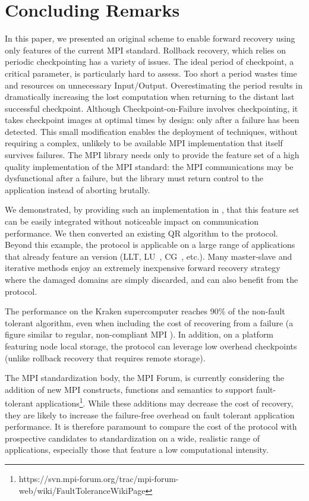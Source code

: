 \section{Concluding Remarks}

In this paper, we presented an original scheme to enable forward
recovery using only features of the current MPI standard.
Rollback recovery, which relies on periodic checkpointing has a variety
of issues. The ideal period of checkpoint, a critical parameter, is
particularly hard to assess. Too short a period wastes time and
resources on unnecessary Input/Output. Overestimating the period results
in dramatically increasing the lost computation when returning to the
distant last successful checkpoint. Although Checkpoint-on-Failure
involves checkpointing, it takes checkpoint images at optimal times by
design: only after a failure has been detected. This small modification
enables the deployment of \abft techniques, without requiring a complex,
unlikely to be available MPI implementation that itself survives
failures. The MPI library needs only to provide the feature set of a
high quality implementation of the MPI standard: the MPI communications
may be dysfunctional after a failure, but the library must return
control to the application instead of aborting brutally.

We demonstrated, by providing such an implementation in \ompi, that this
feature set can be easily integrated without noticeable impact on
communication performance. We then converted an existing \abft QR
algorithm to the \cof protocol. Beyond this example, the \cof protocol
is applicable on a large range of applications that already feature an
\abft version (LLT, LU~\cite{fthpl2011},
CG~\cite{Chen:2005:FTH:1065944.1065973}, etc.). Many master-slave and
iterative methods enjoy an extremely inexpensive forward recovery
strategy where the damaged domains are simply discarded, and can also
benefit from the \cof protocol.

The performance on the Kraken supercomputer reaches
90\% of the non-fault tolerant algorithm, even when including the cost
of recovering from a failure (a figure similar to regular, non-compliant MPI \abft). In addition, on a platform featuring node local storage, the
\cof protocol can leverage low overhead checkpoints (unlike rollback
recovery that requires remote storage).

The MPI standardization body, the MPI Forum, is currently considering
the addition of new MPI constructs, functions and semantics to support
fault-tolerant applications\footnote{https://svn.mpi-forum.org/trac/mpi-forum-web/wiki/FaultToleranceWikiPage}. While these additions may decrease the cost
of recovery, they are likely to increase the failure-free overhead on
fault tolerant application performance. It is therefore paramount to
compare the cost of the \cof protocol with prospective candidates to
standardization on a wide, realistic range of applications, especially
those that feature a low computational intensity.

